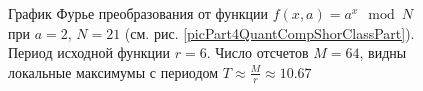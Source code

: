 \begin{figure}
\centering



\caption{График Фурье преобразования от функции 
  $f\left(x, a\right) = a^x \mod{N}$ при $a=2$, $N = 21$
  (см. рис. \ref{picPart4QuantCompShorClassPart}). Период исходной
  функции $r = 6$. Число отсчетов $M = 64$, видны локальные максимумы
  с периодом $T \approx \frac{M}{r} \approx 10.67$}
\label{picPart4QuantCompShorClassPartFourier}
\end{figure}
